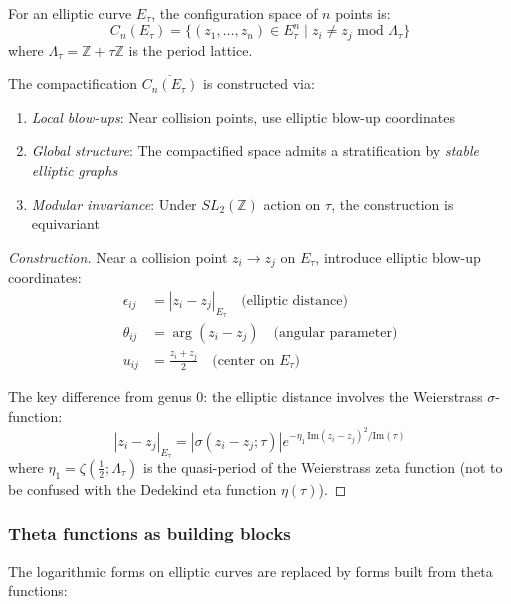 \begin{definition}
For an elliptic curve $E_\tau$, the configuration space of $n$ points is:
\[
C_n(E_\tau) = \{(z_1, \ldots, z_n) \in E_\tau^n \mid z_i \neq z_j \text{ mod } \Lambda_\tau\}
\]
where $\Lambda_\tau = \mathbb{Z} + \tau\mathbb{Z}$ is the period lattice.
\end{definition}

\begin{theorem}
\label{thm:elliptic-compactification}
The compactification $\overline{C_n(E_\tau)}$ is constructed via:
\begin{enumerate}
\item \emph{Local blow-ups}: Near collision points, use elliptic blow-up coordinates
\item \emph{Global structure}: The compactified space admits a stratification by \emph{stable elliptic graphs}
\item \emph{Modular invariance}: Under $SL_2(\mathbb{Z})$ action on $\tau$, the construction is equivariant
\end{enumerate}
\end{theorem}

\begin{proof}[Construction]
Near a collision point $z_i \to z_j$ on $E_\tau$, introduce elliptic blow-up coordinates:
\begin{align}
\epsilon_{ij} &= |z_i - z_j|_{E_\tau} \quad \text{(elliptic distance)} \\
\theta_{ij} &= \arg(z_i - z_j) \quad \text{(angular parameter)} \\
u_{ij} &= \frac{z_i + z_j}{2} \quad \text{(center on } E_\tau)
\end{align}

The key difference from genus 0: the elliptic distance involves the Weierstrass $\sigma$-function:
\[
|z_i - z_j|_{E_\tau} = |\sigma(z_i - z_j; \tau)|e^{-\eta_1\,\text{Im}(z_i - z_j)^2/\text{Im}(\tau)}
\]
where $\eta_1 = \zeta(\tfrac{1}{2}; \Lambda_\tau)$ is the quasi-period of the Weierstrass zeta function (not to be confused with the Dedekind eta function $\eta(\tau)$).
\end{proof}

\subsubsection{Theta functions as building blocks}

The logarithmic forms on elliptic curves are replaced by forms built from theta functions:

